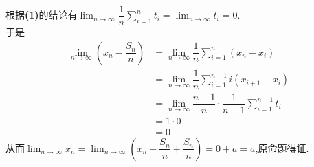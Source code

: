 \documentclass{ctexart}
\begin{document}
\begin{solution}
\begin{enumerate}[label=\textbf{(\arabic*)}]
            根据\textbf{(1)}的结论有$\displaystyle\lim_{n\to\infty}\dfrac{1}{n}\sum_{i=1}^{n}t_i=\lim_{n\to\infty}t_i=0$.\\
            于是
            $$\begin{aligned}
                \lim_{n\to\infty}\left(x_n-\dfrac{S_n}{n}\right)
                &= \lim_{n\to\infty}\dfrac{1}{n}\sum_{i=1}^{n}\left(x_n-x_i\right) \\
                &= \lim_{n\to\infty}\dfrac{1}{n}\sum_{i=1}^{n-1}i\left(x_{i+1}-x_i\right) \\
                &= \lim_{n\to\infty}\dfrac{n-1}{n}\cdot\dfrac{1}{n-1}\sum_{i=1}^{n-1}t_i \\
                &= 1\cdot 0 \\
                &= 0
            \end{aligned}$$
            从而$\displaystyle\lim_{n\to\infty}x_n=\lim_{n\to\infty}{\left(x_n-\dfrac{S_n}{n}+\dfrac{S_n}{n}\right)}=0+a=a$,原命题得证.
    \end{enumerate}
\end{solution}
\end{document}
